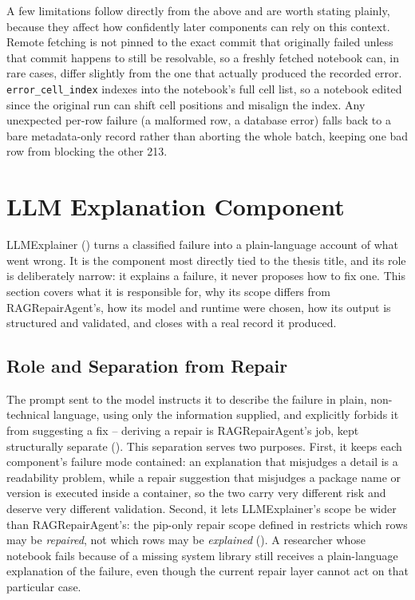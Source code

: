A few limitations follow directly from the above and are worth stating
plainly, because they affect how confidently later components can rely on
this context. Remote fetching is not pinned to the exact commit that
originally failed unless that commit happens to still be resolvable, so a
freshly fetched notebook can, in rare cases, differ slightly from the one
that actually produced the recorded error. \texttt{error\_cell\_index}
indexes into the notebook's full cell list, so a notebook edited since the
original run can shift cell positions and misalign the index. Any
unexpected per-row failure (a malformed row, a database error) falls back
to a bare metadata-only record rather than aborting the whole batch, keeping
one bad row from blocking the other 213.

\section{LLM Explanation Component}
\label{sec:m-explanation}

LLMExplainer () turns a classified failure into a
plain-language account of what went wrong. It is the component most
directly tied to the thesis title, and its role is deliberately narrow: it
explains a failure, it never proposes how to fix one. This section covers
what it is responsible for, why its scope differs from RAGRepairAgent's, how
its model and runtime were chosen, how its output is structured and
validated, and closes with a real record it produced.

\subsection{Role and Separation from Repair}
\label{sec:m-explanation-role}

The prompt sent to the model instructs it to describe the failure in plain,
non-technical language, using only the information supplied, and explicitly
forbids it from suggesting a fix -- deriving a repair is RAGRepairAgent's
job, kept structurally separate (). This separation
serves two purposes. First, it keeps each component's failure mode
contained: an explanation that misjudges a detail is a readability problem,
while a repair suggestion that misjudges a package name or version is
executed inside a container, so the two carry very different risk and
deserve very different validation. Second, it lets LLMExplainer's scope be
wider than RAGRepairAgent's: the pip-only repair scope defined in
 restricts which rows may be \emph{repaired}, not which
rows may be \emph{explained} (). A researcher
whose notebook fails because of a missing system library still receives a
plain-language explanation of the failure, even though the current repair
layer cannot act on that particular case.

